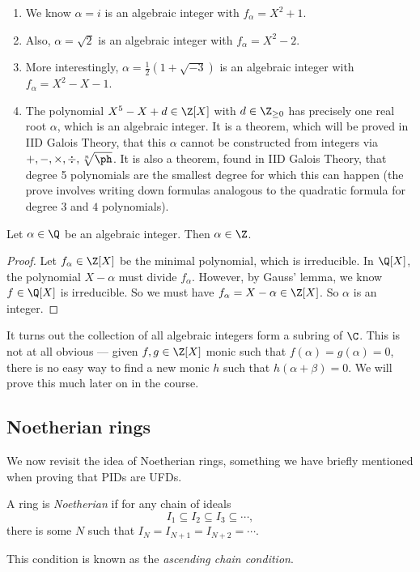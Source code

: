 \documentclass[a4paper]{article}
\begin{document}
\begin{eg}\leavevmode
  \begin{enumerate}
    \item We know $\alpha = i$ is an algebraic integer with $f_\alpha = X^2 + 1$.
    \item Also, $\alpha = \sqrt{2}$ is an algebraic integer with $f_\alpha = X^2 - 2$.
    \item More interestingly, $\alpha = \frac{1}{2}(1 + \sqrt{-3})$ is an algebraic integer with $f_\alpha = X^2 - X - 1$.
    \item The polynomial $X^5 - X + d \in \Z[X]$ with $d \in \Z_{\geq 0}$ has precisely one real root $\alpha$, which is an algebraic integer. It is a theorem, which will be proved in IID Galois Theory, that this $\alpha$ cannot be constructed from integers via $+, -, \times, \div, \sqrt[n]{\ph}$. It is also a theorem, found in IID Galois Theory, that degree 5 polynomials are the smallest degree for which this can happen (the prove involves writing down formulas analogous to the quadratic formula for degree $3$ and $4$ polynomials).
  \end{enumerate}
\end{eg}

\begin{lemma}
  Let $\alpha \in \Q$ be an algebraic integer. Then $\alpha \in \Z$.
\end{lemma}

\begin{proof}
  Let $f_\alpha \in \Z[X]$ be the minimal polynomial, which is irreducible. In $\Q[X]$, the polynomial $X - \alpha$ must divide $f_\alpha$. However, by Gauss' lemma, we know $f \in \Q[X]$ is irreducible. So we must have $f_\alpha = X - \alpha \in \Z[X]$. So $\alpha$ is an integer.
\end{proof}

It turns out the collection of all algebraic integers form a subring of $\C$. This is not at all obvious --- given $f, g \in \Z[X]$ monic such that $f(\alpha) = g(\alpha) = 0$, there is no easy way to find a new monic $h$ such that $h(\alpha + \beta) = 0$. We will prove this much later on in the course.

\subsection{Noetherian rings}
We now revisit the idea of Noetherian rings, something we have briefly mentioned when proving that PIDs are UFDs.
\begin{defi}
  A ring is \emph{Noetherian} if for any chain of ideals
  \[
    I_1 \subseteq I_2 \subseteq I_3 \subseteq \cdots,
  \]
  there is some $N$ such that $I_N = I_{N + 1} = I_{N + 2} = \cdots$.

  This condition is known as the \emph{ascending chain condition}.
\end{defi}
\end{document}
